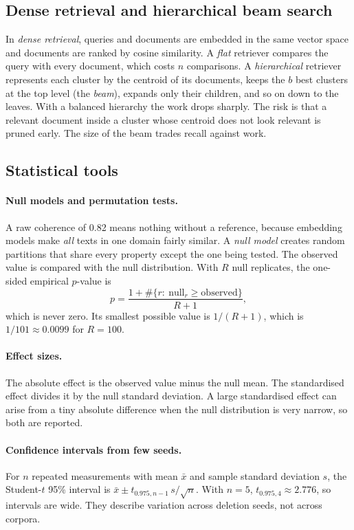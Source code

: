 \documentclass[11pt,a4paper]{article}
\theoremstyle{remark}
\begin{document}
\subsection{Dense retrieval and hierarchical beam search}

In \emph{dense retrieval}, queries and documents are embedded in the same vector
space and documents are ranked by cosine similarity. A \emph{flat} retriever compares
the query with every document, which costs $n$ comparisons. A \emph{hierarchical}
retriever represents each cluster by the centroid of its documents, keeps the $b$ best
clusters at the top level (the \emph{beam}), expands only their children, and so on
down to the leaves. With a balanced hierarchy the work drops sharply. The risk is that
a relevant document inside a cluster whose centroid does not look relevant is pruned
early. The size of the beam trades recall against work.

\subsection{Statistical tools}

\paragraph{Null models and permutation tests.}
A raw coherence of 0.82 means nothing without a reference, because embedding models
make \emph{all} texts in one domain fairly similar. A \emph{null model} creates random
partitions that share every property except the one being tested. The observed value
is compared with the null distribution. With $R$ null replicates, the one-sided
empirical $p$-value is
\begin{equation}
  p=\frac{1+\#\{r:\ \text{null}_r\ge\text{observed}\}}{R+1},
\end{equation}
which is never zero. Its smallest possible value is $1/(R+1)$, which is
$1/101\approx0.0099$ for $R=100$.

\paragraph{Effect sizes.}
The absolute effect is the observed value minus the null mean. The standardised effect
divides it by the null standard deviation. A large standardised effect can arise
from a tiny absolute difference when the null distribution is very narrow, so both are
reported.

\paragraph{Confidence intervals from few seeds.}
For $n$ repeated measurements with mean $\bar x$ and sample standard deviation $s$,
the Student-$t$ 95\% interval is $\bar x\pm t_{0.975,n-1}\,s/\sqrt n$. With $n=5$,
$t_{0.975,4}\approx2.776$, so intervals are wide. They describe variation across
deletion seeds, not across corpora.
\end{document}
